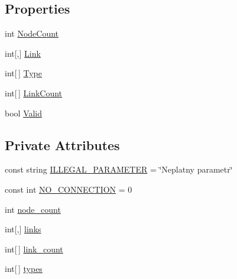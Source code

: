 \subsection*{Properties}
\begin{DoxyCompactItemize}
\item 
int \hyperlink{classNetTrafficSimulator_1_1NetworkModel_ae999583acaea839a7611f610bed2fed6}{Node\-Count}
\item 
int\mbox{[},\mbox{]} \hyperlink{classNetTrafficSimulator_1_1NetworkModel_a80ab4cd62faf7b08759fc997f342c207}{Link}
\item 
int\mbox{[}$\,$\mbox{]} \hyperlink{classNetTrafficSimulator_1_1NetworkModel_a92df1a7e9c05637930eae22d788f7c18}{Type}
\item 
int\mbox{[}$\,$\mbox{]} \hyperlink{classNetTrafficSimulator_1_1NetworkModel_ad5eb61d192908f46907fd7f91f796691}{Link\-Count}
\item 
bool \hyperlink{classNetTrafficSimulator_1_1NetworkModel_a58af85d9a9121926149ef5e2ce332e76}{Valid}
\end{DoxyCompactItemize}
\subsection*{Private Attributes}
\begin{DoxyCompactItemize}
\item 
const string \hyperlink{classNetTrafficSimulator_1_1NetworkModel_a9ff3800009133089edb0744d2771b0b9}{I\-L\-L\-E\-G\-A\-L\-\_\-\-P\-A\-R\-A\-M\-E\-T\-E\-R} = \char`\"{}Neplatny parametr\char`\"{}
\item 
const int \hyperlink{classNetTrafficSimulator_1_1NetworkModel_a9e0ef364abc36d5bd8ebda5d703dc76b}{N\-O\-\_\-\-C\-O\-N\-N\-E\-C\-T\-I\-O\-N} = 0
\item 
int \hyperlink{classNetTrafficSimulator_1_1NetworkModel_a85f9941bb3af088bd078b273f0cb4e52}{node\-\_\-count}
\item 
int\mbox{[},\mbox{]} \hyperlink{classNetTrafficSimulator_1_1NetworkModel_a3b9f06cc5ec93f59a6bf7e4042b70e48}{links}
\item 
int\mbox{[}$\,$\mbox{]} \hyperlink{classNetTrafficSimulator_1_1NetworkModel_a1437bfc2aad1a396054b03452e60c0dd}{link\-\_\-count}
\item 
int\mbox{[}$\,$\mbox{]} \hyperlink{classNetTrafficSimulator_1_1NetworkModel_aa8f0b62fb9e9029f0068135b56a46a9c}{types}
\end{DoxyCompactItemize}


